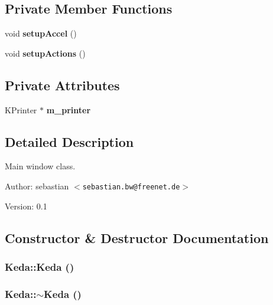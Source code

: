 \subsection*{Private Member Functions}
\begin{CompactItemize}
\item 
void {\bf setup\-Accel} ()
\item 
void {\bf setup\-Actions} ()
\end{CompactItemize}
\subsection*{Private Attributes}
\begin{CompactItemize}
\item 
KPrinter $\ast$ {\bf m\_\-printer}
\end{CompactItemize}


\subsection{Detailed Description}
Main window class. 

\begin{Desc}
\item[Author:]sebastian $<${\tt sebastian.bw@freenet.de}$>$ \end{Desc}
\begin{Desc}
\item[Version:]0.1 \end{Desc}




\subsection{Constructor \& Destructor Documentation}
\subsubsection{\setlength{\rightskip}{0pt plus 5cm}Keda::Keda ()}\label{classKeda_bdcde5bd2edacf1aabd359bcb83de9a2}


\subsubsection{\setlength{\rightskip}{0pt plus 5cm}Keda::$\sim$Keda ()}\label{classKeda_29492221c9b967fa0983a48503b2e371}




